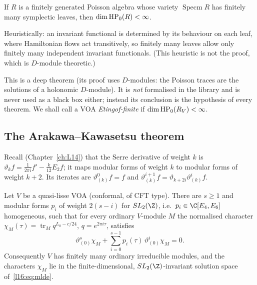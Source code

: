 \begin{theorem}\label{l16:thm:ES}
If $R$ is a finitely generated Poisson algebra whose variety $\operatorname{Specm}R$ has finitely many
symplectic leaves, then $\dim\mathrm{HP}_0(R)<\infty$.
\end{theorem}

\begin{physics}
Heuristically: an invariant functional is determined by its behaviour on each leaf, where Hamiltonian flows act
transitively, so finitely many leaves allow only finitely many independent invariant functionals. (This heuristic is not the
proof, which is $D$-module theoretic.)
\end{physics}

This is a deep theorem (its proof uses $D$-modules: the Poisson traces are the solutions of a holonomic
$D$-module). It is \emph{not} formalised in the library and is never used as a black box either; instead its
conclusion is the hypothesis of every theorem. We shall call a VOA \emph{Etingof-finite} if
$\dim\mathrm{HP}_0(R_V)<\infty$.

\subsection{The Arakawa--Kawasetsu theorem}

Recall (Chapter~\ref{ch:L14}) that the Serre derivative of weight $k$ is
$\vartheta_k f = \frac{1}{2\pi i}f' - \frac{k}{12}E_2 f$; it maps modular forms of weight $k$ to modular forms of
weight $k+2$. Its iterates are $\vartheta^{0}_{(k)} f = f$ and $\vartheta^{i+1}_{(k)}f =
\vartheta_{k+2i}\vartheta^{i}_{(k)}f$.

\begin{theorem}\label{l16:thm:AK}
Let $V$ be a quasi-lisse VOA (conformal, of CFT type). There are $s\ge1$ and modular forms $p_i$ of weight
$2(s-i)$ for $SL_2(\Z)$, i.e.\ $p_i\in\C[E_4,E_6]$ homogeneous, such that for every ordinary $V$-module $M$ the
normalised character $\chi_M(\tau) = \operatorname{tr}_M q^{L_0-c/24}$, $q = e^{2\pi i\tau}$, satisfies
\begin{equation}\label{l16:eq:mlde}
\vartheta^{s}_{(0)}\chi_M + \sum_{i=0}^{s-1}p_i(\tau)\,\vartheta^{i}_{(0)}\chi_M = 0 .
\end{equation}
Consequently $V$ has finitely many ordinary irreducible modules, and the characters $\chi_M$ lie in the
finite-dimensional, $SL_2(\Z)$-invariant solution space of~\eqref{l16:eq:mlde}.
\end{theorem}

